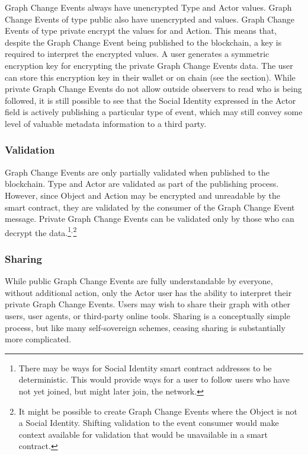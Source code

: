 \documentclass[12pt,letterpaper]{article}
\begin{document}
Graph Change Events always have unencrypted Type and Actor values. Graph Change Events of
type public also have unencrypted  and
 values. Graph Change Events of type private encrypt the values for
 and Action. This means that, despite the Graph Change Event being published
to the blockchain, a key is required to interpret the encrypted values. A user generates a
symmetric encryption key for encrypting the private Graph Change Events data. The user can
store this encryption key in their wallet or on chain (see the  section).
While private Graph Change Events do not allow outside observers to read who is being
followed, it is still possible to see that the Social Identity expressed in the Actor
field is actively publishing a particular type of event, which may still convey some level
of valuable metadata information to a third party.

\subsubsection{Validation}

Graph Change Events are only partially validated when published to the blockchain. Type
and Actor are validated as part of the publishing process. However, since Object and
Action may be encrypted and unreadable by the smart contract, they are validated by the
consumer of the Graph Change Event message. Private Graph Change Events can be validated
only by those who can decrypt the data.\footnote{There may be ways for Social Identity
	smart contract addresses to be deterministic. This would provide ways for a user to follow
	users who have not yet joined, but might later join, the network.}$^{,}$\footnote{It might
	be possible to create Graph Change Events where the Object is not a Social Identity.
	Shifting validation to the event consumer would make context available for validation that
	would be unavailable in a smart contract.}

\subsubsection{Sharing}

While public Graph Change Events are fully understandable by everyone, without additional
action, only the Actor user has the ability to interpret their private Graph Change
Events. Users may wish to share their graph with other users, user agents, or third-party
online tools. Sharing is a conceptually simple process, but like many self-sovereign
schemes, ceasing sharing is substantially more complicated.
\end{document}
